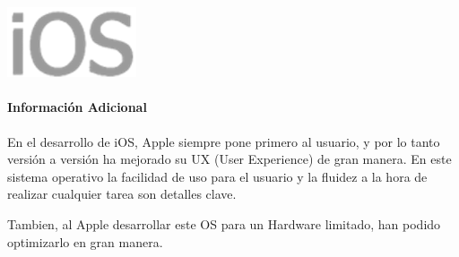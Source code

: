 \documentclass{beamer}
\newcommand*{\ioslogo}{\includegraphics[scale=0.25]{img/logo2.png} \ }%
\begin{document}
\begin{frame}
\frametitle{\ioslogo}
\framesubtitle{Información Adicional}
	En el desarrollo de iOS, Apple siempre pone primero al usuario, y por lo tanto versión a versión ha mejorado su UX (User Experience) de gran manera. En este sistema operativo la facilidad de uso para el usuario y la fluidez a la hora de realizar cualquier tarea son detalles clave.
	
	Tambien, al Apple desarrollar este OS para un Hardware limitado, han podido optimizarlo en gran manera.
\end{frame}

%	
%	
\end{document}
